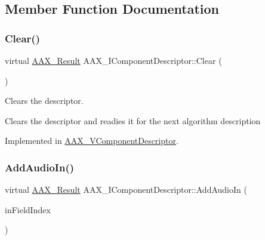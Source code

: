 \subsection{Member Function Documentation}
\mbox{\label{a01781_a0ba6941428a6e272f72a6fadb474394f}} 
\subsubsection{\texorpdfstring{Clear()}{Clear()}}
{\footnotesize\ttfamily virtual \mbox{\hyperlink{a00392_a4d8f69a697df7f70c3a8e9b8ee130d2f}{A\+A\+X\+\_\+\+Result}} A\+A\+X\+\_\+\+I\+Component\+Descriptor\+::\+Clear (\begin{DoxyParamCaption}{ }\end{DoxyParamCaption})\hspace{0.3cm}{\ttfamily [pure virtual]}}



Clears the descriptor. 

Clears the descriptor and readies it for the next algorithm description 

Implemented in \mbox{\hyperlink{a01901_a46226eb4c9b31c5c55296bab4f02d91c}{A\+A\+X\+\_\+\+V\+Component\+Descriptor}}.

\mbox{\label{a01781_a5fad32eff268756c9b4309431321f9b3}} 
\subsubsection{\texorpdfstring{AddAudioIn()}{AddAudioIn()}}
{\footnotesize\ttfamily virtual \mbox{\hyperlink{a00392_a4d8f69a697df7f70c3a8e9b8ee130d2f}{A\+A\+X\+\_\+\+Result}} A\+A\+X\+\_\+\+I\+Component\+Descriptor\+::\+Add\+Audio\+In (\begin{DoxyParamCaption}\item[{\mbox{\hyperlink{a00392_ae807f8986143820cfb5d6da32165c9c7}{A\+A\+X\+\_\+\+C\+Field\+Index}}}]{in\+Field\+Index }\end{DoxyParamCaption})\hspace{0.3cm}{\ttfamily [pure virtual]}}



